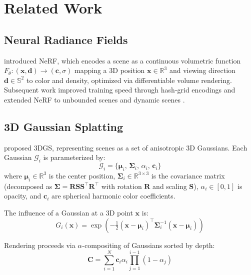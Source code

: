 \documentclass[12pt, a4paper]{article}
\begin{document}
\section{Related Work}

\subsection{Neural Radiance Fields}

\citet{mildenhall2020nerf} introduced NeRF, which encodes a scene as a continuous
volumetric function $F_\theta: (\mathbf{x}, \mathbf{d}) \to (\mathbf{c}, \sigma)$
mapping a 3D position $\mathbf{x} \in \mathbb{R}^3$ and viewing direction
$\mathbf{d} \in \mathbb{S}^2$ to color and density, optimized via differentiable
volume rendering. Subsequent work improved training speed through hash-grid
encodings \citep{muller2022instant} and extended NeRF to unbounded scenes
\citep{barron2022mipnerf360} and dynamic scenes \citep{pumarola2021dnerf}.

\subsection{3D Gaussian Splatting}

\citet{kerbl20233dgs} proposed 3DGS, representing scenes as a set of anisotropic
3D Gaussians. Each Gaussian $\mathcal{G}_i$ is parameterized by:
\begin{equation}
    \mathcal{G}_i = \{\boldsymbol{\mu}_i,\, \boldsymbol{\Sigma}_i,\, \alpha_i,\, \mathbf{c}_i\}
\end{equation}
where $\boldsymbol{\mu}_i \in \mathbb{R}^3$ is the center position,
$\boldsymbol{\Sigma}_i \in \mathbb{R}^{3\times3}$ is the covariance matrix
(decomposed as $\boldsymbol{\Sigma} = \mathbf{R}\mathbf{S}\mathbf{S}^\top\mathbf{R}^\top$
with rotation $\mathbf{R}$ and scaling $\mathbf{S}$), $\alpha_i \in [0,1]$ is
opacity, and $\mathbf{c}_i$ are spherical harmonic color coefficients.

The influence of a Gaussian at a 3D point $\mathbf{x}$ is:
\begin{equation}
    G_i(\mathbf{x}) = \exp\!\left(-\tfrac{1}{2}(\mathbf{x}-\boldsymbol{\mu}_i)^\top \boldsymbol{\Sigma}_i^{-1} (\mathbf{x}-\boldsymbol{\mu}_i)\right)
\end{equation}

Rendering proceeds via $\alpha$-compositing of Gaussians sorted by depth:
\begin{equation}
    \mathbf{C} = \sum_{i=1}^{N} \mathbf{c}_i \alpha_i \prod_{j=1}^{i-1}(1 - \alpha_j)
\end{equation}
\end{document}
